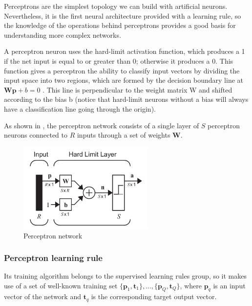 
\label{subsec:ANN:perceptron}

Perceptrons are the simplest topology we can build with artificial neurons. 
Nevertheless, it is the first neural architecture provided with a learning rule,
so the knowledge of the operations behind perceptrons provides a good
basis for understanding more complex networks.

A perceptron neuron uses the hard-limit activation function, which produces a 1 if the net input is equal to or greater than 0; otherwise it produces a 0. 
This function gives a perceptron the ability to classify input vectors by dividing the input space into two regions, which are formed by the decision boundary line at $\mathbf{Wp} + b = 0$ \cite{demuth2008neural}. 
This line is perpendicular to the weight matrix W and shifted according to the bias b 
(notice that hard-limit neurons without a bias will always have a classification line going through the origin).

As shown in , the perceptron network consists of a single layer of 
$S$ perceptron neurons connected to $R$ inputs through a set of weights $\mathbf{W}$. 

\begin{figure}[!ht]
\centering
\includegraphics[width=0.6\textwidth]{images/perceptron.png}
\caption{Perceptron network}
\label{fig:perceptron}
\end{figure}

\subsubsection{Perceptron learning rule}
\label{subsubsec:percpetrontraining}

Its training algorithm belongs to the supervised learning rules group, 
so it makes use of a set of well-known training set $\{\mathbf{p}_1,\mathbf{t}_1\}, ... , \{\mathbf{p}_Q,\mathbf{t}_Q\}$, where $\mathbf{p}_q$ is an input vector of the network and $\mathbf{t}_q$ is the corresponding target output vector. 

